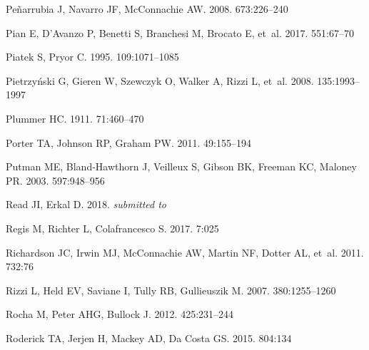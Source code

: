 \documentclass[a4paper]{ar-1col}
\begin{document}
\begin{thebibliography}{}
{Pe{\~n}arrubia} J, {Navarro} JF, {McConnachie} AW. 2008.
\textit{\apj} 673:226--240

{Pian} E, {D'Avanzo} P, {Benetti} S, {Branchesi} M, {Brocato} E, et~al. 2017.
\textit{\nat} 551:67--70

{Piatek} S, {Pryor} C. 1995.
\textit{\aj} 109:1071--1085

{Pietrzy{\'n}ski} G, {Gieren} W, {Szewczyk} O, {Walker} A, {Rizzi} L, et~al.
  2008.
\textit{\aj} 135:1993--1997

{Plummer} HC. 1911.
\textit{\mnras} 71:460--470

{Porter} TA, {Johnson} RP, {Graham} PW. 2011.
\textit{\araa} 49:155--194

{Putman} ME, {Bland-Hawthorn} J, {Veilleux} S, {Gibson} BK, {Freeman} KC,
  {Maloney} PR. 2003.
\textit{\apj} 597:948--956

{Read} JI, {Erkal} D. 2018.
\textit{submitted to \mnras}

{Regis} M, {Richter} L, {Colafrancesco} S. 2017.
\textit{\jcap} 7:025

{Richardson} JC, {Irwin} MJ, {McConnachie} AW, {Martin} NF, {Dotter} AL, et~al.
  2011.
\textit{\apj} 732:76

{Rizzi} L, {Held} EV, {Saviane} I, {Tully} RB, {Gullieuszik} M. 2007.
\textit{\mnras} 380:1255--1260

{Rocha} M, {Peter} AHG, {Bullock} J. 2012.
\textit{\mnras} 425:231--244

{Roderick} TA, {Jerjen} H, {Mackey} AD, {Da Costa} GS. 2015.
\textit{\apj} 804:134


\end{thebibliography}
\end{document}
